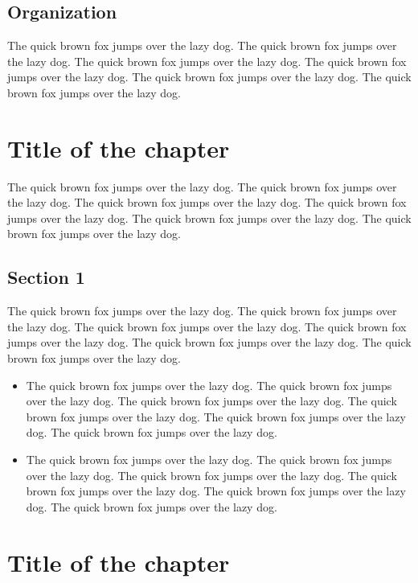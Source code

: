 \documentclass[11pt,a4paper]{report}
\begin{document}
\section{Organization}
\label{sec:org}
The quick brown fox jumps over the lazy dog. The quick brown fox jumps over the lazy dog. The quick brown fox jumps over the lazy dog. The quick brown fox jumps over the lazy dog. The quick brown fox jumps over the lazy dog. The quick brown fox jumps over the lazy dog. 

\chapter{Title of the chapter}
\label{cap:name1}

The quick brown fox jumps over the lazy dog. The quick brown fox jumps over the lazy dog. The quick brown fox jumps over the lazy dog. The quick brown fox jumps over the lazy dog. The quick brown fox jumps over the lazy dog. The quick brown fox jumps over the lazy dog. 

\section{Section 1}
\label{sec:sec1}

The quick brown fox jumps over the lazy dog. The quick brown fox jumps over the lazy dog. The quick brown fox jumps over the lazy dog. The quick brown fox jumps over the lazy dog. The quick brown fox jumps over the lazy dog. The quick brown fox jumps over the lazy dog. 

\begin{itemize}
    \item The quick brown fox jumps over the lazy dog. The quick brown fox jumps over the lazy dog. The quick brown fox jumps over the lazy dog. The quick brown fox jumps over the lazy dog. The quick brown fox jumps over the lazy dog. The quick brown fox jumps over the lazy dog. 
    \item The quick brown fox jumps over the lazy dog. The quick brown fox jumps over the lazy dog. The quick brown fox jumps over the lazy dog. The quick brown fox jumps over the lazy dog. The quick brown fox jumps over the lazy dog. The quick brown fox jumps over the lazy dog. 
\end{itemize}

\chapter{Title of the chapter}
\label{cap:name2}
\end{document}
